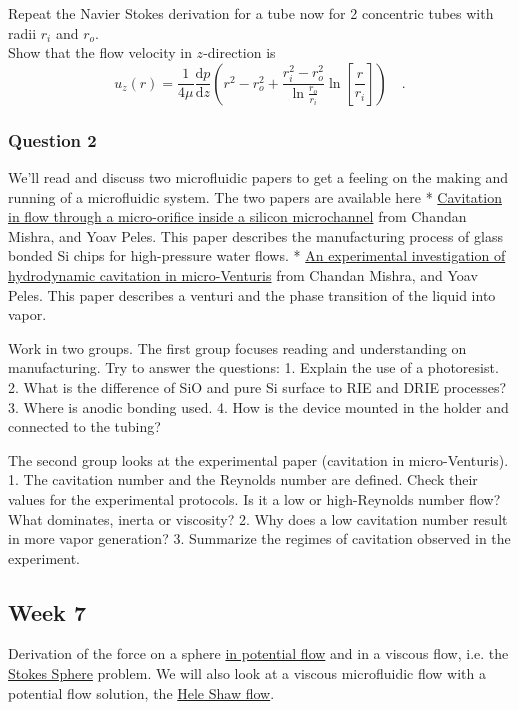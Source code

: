 \documentclass[11pt]{article}
\begin{document}
Repeat the Navier Stokes derivation for a tube now for 2 concentric
tubes with radii \(r_i\) and \(r_o\).\\
 Show that the flow velocity in \(z\)-direction is \[
u_z(r)=\frac{1}{4\mu}\frac{\mathrm{d}p}{\mathrm{d}z}\left(r^2-r_o^2+\frac{r_i^2-r_o^2}{\ln \frac{r_o}{r_i}}\ln\left[\frac{r}{r_i}\right]\right)\quad .
\]

\subsubsection{Question 2}\label{question-2-1}

We'll read and discuss two microfluidic papers to get a feeling on the
making and running of a microfluidic system. The two papers are
available here *
\href{pdf/manufacture\%20microfluidic\%20venturi.pdf}{Cavitation in flow
through a micro-orifice inside a silicon microchannel} from Chandan
Mishra, and Yoav Peles. This paper describes the manufacturing process
of glass bonded Si chips for high-pressure water flows. *
\href{pdf/microfluidic\%20venturi.pdf}{An experimental investigation of
hydrodynamic cavitation in micro-Venturis} from Chandan Mishra, and Yoav
Peles. This paper describes a venturi and the phase transition of the
liquid into vapor.

Work in two groups. The first group focuses reading and understanding on
manufacturing. Try to answer the questions: 1. Explain the use of a
photoresist. 2. What is the difference of SiO and pure Si surface to RIE
and DRIE processes? 3. Where is anodic bonding used. 4. How is the
device mounted in the holder and connected to the tubing?

The second group looks at the experimental paper (cavitation in
micro-Venturis). 1. The cavitation number and the Reynolds number are
defined. Check their values for the experimental protocols. Is it a low
or high-Reynolds number flow? What dominates, inerta or viscosity? 2.
Why does a low cavitation number result in more vapor generation? 3.
Summarize the regimes of cavitation observed in the experiment.

\subsection{Week 7}\label{week-7-1}

Derivation of the force on a sphere \href{Potential\%20Sphere.ipynb}{in
potential flow} and in a viscous flow, i.e. the
\href{Stokes\%20Sphere.ipynb}{Stokes Sphere} problem. We will also look
at a viscous microfluidic flow with a potential flow solution, the
\href{Hele\%20Shaw\%20Flow.ipynb}{Hele Shaw flow}.
\end{document}
